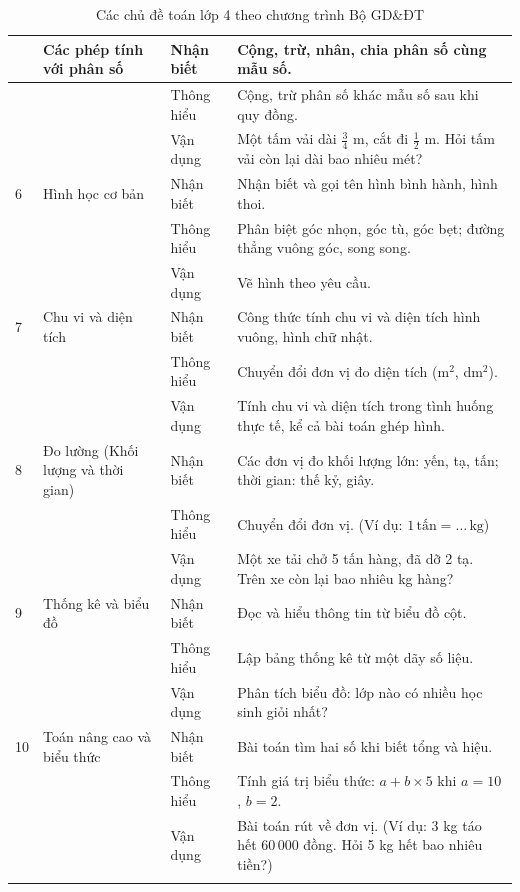 \begin{longtable}{|>{\centering\arraybackslash}m{0.8cm}|m{3.5cm}|>{\centering\arraybackslash}m{2cm}|m{7.5cm}|}
	5 & Các phép tính với phân số
	& Nhận biết & Cộng, trừ, nhân, chia phân số cùng mẫu số. \\
	\cline{3-4}
	& & Thông hiểu & Cộng, trừ phân số khác mẫu số sau khi quy đồng. \\
	\cline{3-4}
	& & Vận dụng & Một tấm vải dài $\frac{3}{4}$ m, cắt đi $\frac{1}{2}$ m. Hỏi tấm vải còn lại dài bao nhiêu mét? \\
	\hline

	6 & Hình học cơ bản
	& Nhận biết & Nhận biết và gọi tên hình bình hành, hình thoi. \\
	\cline{3-4}
	& & Thông hiểu & Phân biệt góc nhọn, góc tù, góc bẹt; đường thẳng vuông góc, song song. \\
	\cline{3-4}
	& & Vận dụng & Vẽ hình theo yêu cầu. \\
	\hline

	7 & Chu vi và diện tích
	& Nhận biết & Công thức tính chu vi và diện tích hình vuông, hình chữ nhật. \\
	\cline{3-4}
	& & Thông hiểu & Chuyển đổi đơn vị đo diện tích (m$^2$, dm$^2$). \\
	\cline{3-4}
	& & Vận dụng & Tính chu vi và diện tích trong tình huống thực tế, kể cả bài toán ghép hình. \\
	\hline

	8 & Đo lường (Khối lượng và thời gian)
	& Nhận biết & Các đơn vị đo khối lượng lớn: yến, tạ, tấn; thời gian: thế kỷ, giây. \\
	\cline{3-4}
	& & Thông hiểu & Chuyển đổi đơn vị. (Ví dụ: $1\,\text{tấn} = \ldots\,\text{kg}$) \\
	\cline{3-4}
	& & Vận dụng & Một xe tải chở 5 tấn hàng, đã dỡ 2 tạ. Trên xe còn lại bao nhiêu kg hàng? \\
	\hline

	9 & Thống kê và biểu đồ
	& Nhận biết & Đọc và hiểu thông tin từ biểu đồ cột. \\
	\cline{3-4}
	& & Thông hiểu & Lập bảng thống kê từ một dãy số liệu. \\
	\cline{3-4}
	& & Vận dụng & Phân tích biểu đồ: lớp nào có nhiều học sinh giỏi nhất? \\
	\hline

	10 & Toán nâng cao và biểu thức
	& Nhận biết & Bài toán tìm hai số khi biết tổng và hiệu. \\
	\cline{3-4}
	& & Thông hiểu & Tính giá trị biểu thức: $a + b \times 5$ khi $a=10$, $b=2$. \\
	\cline{3-4}
	& & Vận dụng & Bài toán rút về đơn vị. (Ví dụ: 3 kg táo hết 60\,000 đồng. Hỏi 5 kg hết bao nhiêu tiền?) \\
	\hline

	\caption{Các chủ đề toán lớp 4 theo chương trình Bộ GD\&ĐT}
	\label{tab:toan-lop4}
\end{longtable}

